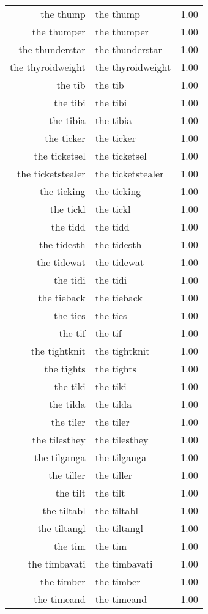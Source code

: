 \begin{table}[ht]
\begin{tabular}{rlr}
  the thump & the thump & 1.00 \\ 
  the thumper & the thumper & 1.00 \\ 
  the thunderstar & the thunderstar & 1.00 \\ 
  the thyroidweight & the thyroidweight & 1.00 \\ 
  the tib & the tib & 1.00 \\ 
  the tibi & the tibi & 1.00 \\ 
  the tibia & the tibia & 1.00 \\ 
  the ticker & the ticker & 1.00 \\ 
  the ticketsel & the ticketsel & 1.00 \\ 
  the ticketstealer & the ticketstealer & 1.00 \\ 
  the ticking & the ticking & 1.00 \\ 
  the tickl & the tickl & 1.00 \\ 
  the tidd & the tidd & 1.00 \\ 
  the tidesth & the tidesth & 1.00 \\ 
  the tidewat & the tidewat & 1.00 \\ 
  the tidi & the tidi & 1.00 \\ 
  the tieback & the tieback & 1.00 \\ 
  the ties & the ties & 1.00 \\ 
  the tif & the tif & 1.00 \\ 
  the tightknit & the tightknit & 1.00 \\ 
  the tights & the tights & 1.00 \\ 
  the tiki & the tiki & 1.00 \\ 
  the tilda & the tilda & 1.00 \\ 
  the tiler & the tiler & 1.00 \\ 
  the tilesthey & the tilesthey & 1.00 \\ 
  the tilganga & the tilganga & 1.00 \\ 
  the tiller & the tiller & 1.00 \\ 
  the tilt & the tilt & 1.00 \\ 
  the tiltabl & the tiltabl & 1.00 \\ 
  the tiltangl & the tiltangl & 1.00 \\ 
  the tim & the tim & 1.00 \\ 
  the timbavati & the timbavati & 1.00 \\ 
  the timber & the timber & 1.00 \\ 
  the timeand & the timeand & 1.00 \\ 

\end{tabular}
\end{table}
